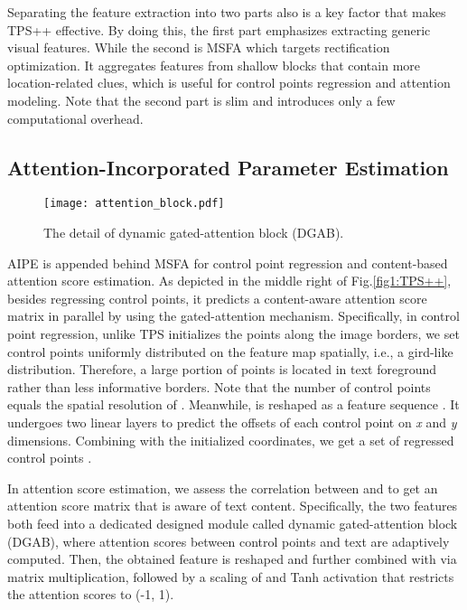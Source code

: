 \documentclass{article}
\begin{document}
Separating the feature extraction into two parts also is a key factor that makes TPS++ effective. By doing this, the first part emphasizes extracting generic visual features. While the second is MSFA which targets rectification optimization. It aggregates features from shallow blocks that contain more location-related clues, which is useful for control points regression and attention modeling. Note that the second part is slim and introduces only a few computational overhead.


\subsection{Attention-Incorporated Parameter Estimation}

\begin{figure}[t]
\centering
\texttt{[image:  attention\_block.pdf]} \caption{The detail of dynamic gated-attention block (DGAB).}
\label{fig1:motivation}
\end{figure}


AIPE is appended behind MSFA for control point regression and content-based attention score estimation. As depicted in the middle right of Fig.\ref{fig1:TPS++}, besides regressing control points, it predicts a content-aware attention score matrix  in parallel by using the gated-attention mechanism. Specifically, in control point regression, unlike TPS initializes the points along the image borders, we set control points  uniformly distributed on the feature map spatially, i.e., a gird-like distribution. Therefore, a large portion of points is located in text foreground rather than less informative borders. Note that the number of control points equals the spatial resolution of . Meanwhile,  is reshaped as a feature sequence . It undergoes two linear layers to predict the offsets of each control point on \emph{x} and \emph{y} dimensions. Combining with the initialized coordinates, we get a set of regressed control points .

In attention score estimation, we assess the correlation between  and  to get an attention score matrix  that is aware of text content. Specifically, the two features both feed into a dedicated designed module called dynamic gated-attention block (DGAB), where attention scores between control points and text are adaptively computed. Then, the obtained feature is reshaped and further combined with  via matrix multiplication, followed by a scaling of  and Tanh activation that restricts the attention scores to (-1, 1).
\end{document}
